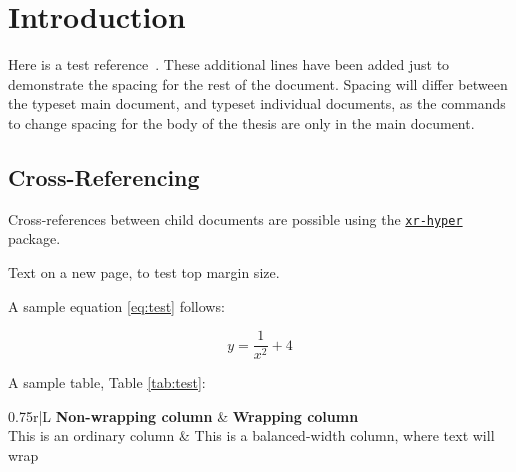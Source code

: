 \documentclass[\main/thesis.tex]{subfiles}
\begin{document}
\chapter{Introduction}

Here is a test reference~\cite{Knuth68:art_of_programming}.
These additional lines have been added just to demonstrate the spacing
for the rest of the document. Spacing will differ between the typeset main
document, and typeset individual documents, as the commands
to change spacing for the body of the thesis are only in the main document.

\section{Cross-Referencing}\label{sec:crossRef}

Cross-references between child documents are possible using the
\href{https://ctan.org/pkg/xr-hyper}{\texttt{xr-hyper}} package.

\newpage

Text on a new page, to test top margin size.

A sample equation \eqref{eq:test} follows:

\begin{equation}
y = \frac{1}{x^2} + 4 \label{eq:test}
\end{equation}

A sample table, Table \ref{tab:test}:

\begin{table}[h]
    \centering
    \begin{tabulary}{0.75\textwidth}{r|L}
    \textbf{Non-wrapping column} & \textbf{Wrapping column} \\ \hline
    This is an ordinary column & This is a balanced-width column, where text will wrap
    \end{tabulary}
    \caption[A sample table] {A sample table created using the \href{https://ctan.org/pkg/tabulary}{\texttt{tabulary}} package}
    \label{tab:test}
\end{table}
\end{document}
